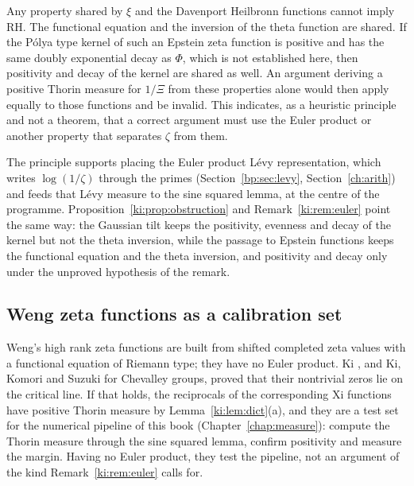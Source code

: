 \begin{remark}\label{ki:rem:euler}
Any property shared by $\xi$ and the Davenport Heilbronn functions cannot imply RH. The functional equation and the inversion of the theta function are shared. If the P\'olya type kernel of such an Epstein zeta function is positive and has the same doubly exponential decay as $\Phi$, which is not established here, then positivity and decay of the kernel are shared as well. %
An argument deriving a positive Thorin measure for $1/\Xi$ from these properties alone would then apply equally to those functions and be invalid. This indicates, as a heuristic principle and not a theorem, that a correct argument must use the Euler product or another property that separates $\zeta$ from them.
\end{remark}

The principle supports placing the Euler product L\'evy representation, which writes $\log(1/\zeta)$ through the primes (Section~\ref{bp:sec:levy}, Section~\ref{ch:arith}) and feeds that L\'evy measure to the sine squared lemma, at the centre of the programme. Proposition~\ref{ki:prop:obstruction} and Remark~\ref{ki:rem:euler} point the same way: the Gaussian tilt keeps the positivity, evenness and decay of the kernel but not the theta inversion, while the passage to Epstein functions keeps the functional equation and the theta inversion, and positivity and decay only under the unproved hypothesis of the remark.

\subsection{Weng zeta functions as a calibration set}

Weng's high rank zeta functions are built from shifted completed zeta values with a functional equation of Riemann type; they have no Euler product. Ki \cite{Ki10}, and Ki, Komori and Suzuki \cite{KKS15} for Chevalley groups, proved that their nontrivial zeros lie on the critical line. %
If that holds, the reciprocals of the corresponding Xi functions have positive Thorin measure by Lemma~\ref{ki:lem:dict}(a), and they are a test set for the numerical pipeline of this book (Chapter~\ref{chap:measure}): compute the Thorin measure through the sine squared lemma, confirm positivity and measure the margin. Having no Euler product, they test the pipeline, not an argument of the kind Remark~\ref{ki:rem:euler} calls for.

